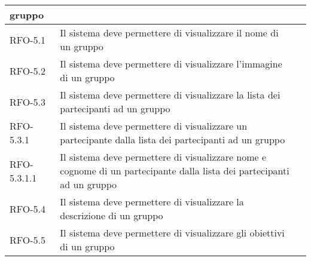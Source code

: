 \begin{center}
{\begin{longtable}{
      |>{\centering\arraybackslash}p{60pt}
      |>{\centering\arraybackslash}p{220pt}
      |>{\centering\arraybackslash}p{60pt}|}
      gruppo                                                               &
      \nameref{uc:scenario-visualizzazione-dettaglio-gruppo}                    \\
      \hline
      RFO-5.1                                                              & Il
      sistema deve permettere di visualizzare il nome di un
      gruppo                                                               &
      \nameref{sub:visualizzazione-nome-gruppo}                                 \\
      \hline
      RFO-5.2                                                              & Il
      sistema deve permettere di visualizzare l'immagine di
      un gruppo                                                            &
      \nameref{sub:visualizzazione-immagine-gruppo}                             \\
      \hline

      RFO-5.3                                                              & Il
      sistema deve permettere di visualizzare la lista dei
      partecipanti ad un gruppo                                            &
      \nameref{sub:visualizzazione-utenti-gruppo}                               \\
      \hline

      RFO-5.3.1                                                            & Il
      sistema deve permettere di visualizzare un
      partecipante dalla lista dei partecipanti ad un gruppo               &
      \nameref{subsub:visualizzazione-partecipanti-gruppo}
      \\
      \hline

      RFO-5.3.1.1                                                          & Il
      sistema deve permettere di visualizzare nome e
      cognome di un partecipante dalla lista dei partecipanti ad un gruppo &
      \nameref{subsubsub:visualizzazione-singolo-partecipante-gruppo}
      \\
      \hline

      RFO-5.4                                                              & Il
      sistema deve permettere di visualizzare la descrizione
      di un gruppo                                                         &
      \nameref{sub:visualizzazione-descrizione-gruppo}                          \\
      \hline

      RFO-5.5                                                              & Il
      sistema deve permettere di visualizzare gli obiettivi
      di un gruppo                                                         &
      \nameref{sub:visualizzazione-obiettivi-gruppo}                            \\
      \hline


\end{longtable}}
\end{center}
